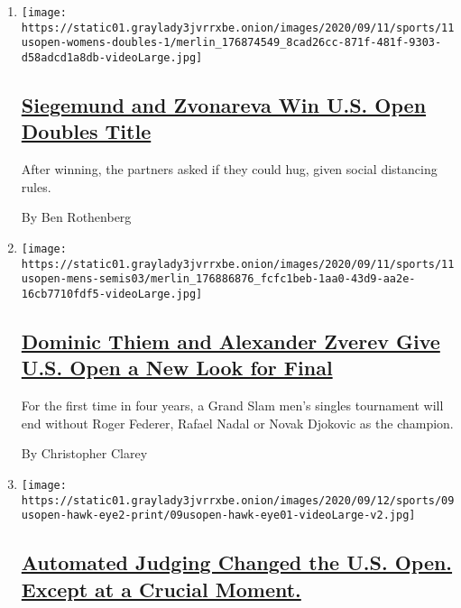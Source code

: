 \begin{enumerate}
\def\labelenumi{\arabic{enumi}.}
\item
  \texttt{[image: https://static01.graylady3jvrrxbe.onion/images/2020/09/11/sports/11usopen-womens-doubles-1/merlin\_176874549\_8cad26cc-871f-481f-9303-d58adcd1a8db-videoLarge.jpg]}

  \hypertarget{siegemund-and-zvonareva-win-us-open-doubles-title}{%
  \subsection{\texorpdfstring{\href{/2020/09/11/sports/tennis/siegemund-zvonareva-us-open-doubles.html}{Siegemund
  and Zvonareva Win U.S. Open Doubles
  Title}}{Siegemund and Zvonareva Win U.S. Open Doubles Title}}\label{siegemund-and-zvonareva-win-us-open-doubles-title}}

  After winning, the partners asked if they could hug, given social
  distancing rules.

  By Ben Rothenberg
\item
  \texttt{[image: https://static01.graylady3jvrrxbe.onion/images/2020/09/11/sports/11usopen-mens-semis03/merlin\_176886876\_fcfc1beb-1aa0-43d9-aa2e-16cb7710fdf5-videoLarge.jpg]}

  \hypertarget{dominic-thiem-and-alexander-zverev-give-us-open-a-new-look-for-final}{%
  \subsection{\texorpdfstring{\href{/2020/09/11/sports/tennis/us-open-mens-semifinals-alexander-zverev-daniil-medvedev-dominic-thiem.html}{Dominic
  Thiem and Alexander Zverev Give U.S. Open a New Look for
  Final}}{Dominic Thiem and Alexander Zverev Give U.S. Open a New Look for Final}}\label{dominic-thiem-and-alexander-zverev-give-us-open-a-new-look-for-final}}

  For the first time in four years, a Grand Slam men's singles
  tournament will end without Roger Federer, Rafael Nadal or Novak
  Djokovic as the champion.

  By Christopher Clarey
\item
  \texttt{[image: https://static01.graylady3jvrrxbe.onion/images/2020/09/12/sports/09usopen-hawk-eye2-print/09usopen-hawk-eye01-videoLarge-v2.jpg]}

  \hypertarget{automated-judging-changed-the-us-open-except-at-a-crucial-moment}{%
  \subsection{\texorpdfstring{\href{/2020/09/10/sports/tennis/us-open-hawk-eye-live-novak-djokovic.html}{Automated
  Judging Changed the U.S. Open. Except at a Crucial
  Moment.}}{Automated Judging Changed the U.S. Open. Except at a Crucial Moment.}}\label{automated-judging-changed-the-us-open-except-at-a-crucial-moment}}


\end{enumerate}
